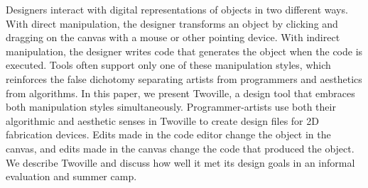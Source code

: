 Designers interact with digital representations of objects in two different ways. With direct manipulation, the designer transforms an object by clicking and dragging on the canvas with a mouse or other pointing device. With indirect manipulation, the designer writes code that generates the object when the code is executed. Tools often support only one of these manipulation styles, which reinforces the false dichotomy separating artists from programmers and aesthetics from algorithms. In this paper, we present Twoville, a design tool that embraces both manipulation styles simultaneously. Programmer-artists use both their algorithmic and aesthetic senses in Twoville to create design files for 2D fabrication devices. Edits made in the code editor change the object in the canvas, and edits made in the canvas change the code that produced the object. We describe Twoville and discuss how well it met its design goals in an informal evaluation and summer camp.
